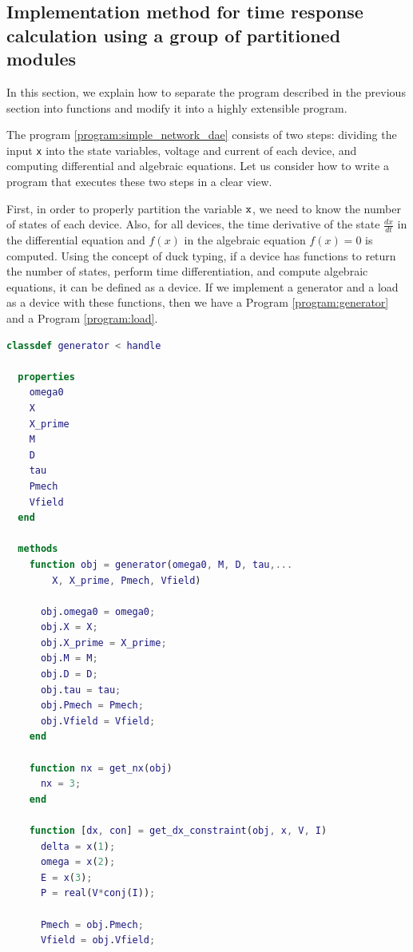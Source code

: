 \documentclass[graybox, envcountchap]{svmult}
\begin{document}
\subsection{Implementation method for time response calculation using a group of partitioned modules}
In this section, we explain how to separate the program described in the
previous section into functions and modify it into a highly extensible program.

\begin{example}\label{ex:gen_load}
  The program \nobreak\ref{program:simple_network_dae} consists of two steps:
  dividing the input \verb|x| into the state variables, voltage and current of
  each device, and computing differential and algebraic equations. Let us
  consider how to write a program that executes these two steps in a clear view.
 
  First, in order to properly partition the variable $\verb|x|$, we need to know
  the number of states of each device. Also, for all devices, the time
  derivative of the state $\tfrac{dx}{dt}$ in the differential equation and
  $f(x)$ in the algebraic equation $f(x)=0$ is computed. Using the concept of
  duck typing, if a device has functions to return the number of states, perform
  time differentiation, and compute algebraic equations, it can be defined as a
  device. If we implement a generator and a load as a device with these
  functions, then we have a Program \nobreak\ref{program:generator} and a
  Program \ref{program:load}.


\begin{lstlisting}[language=Matlab, caption=generator.m, label={program:generator}]
classdef generator < handle
    
  properties
    omega0
    X
    X_prime
    M
    D
    tau
    Pmech
    Vfield
  end

  methods
    function obj = generator(omega0, M, D, tau,...
        X, X_prime, Pmech, Vfield)

      obj.omega0 = omega0;
      obj.X = X;
      obj.X_prime = X_prime;
      obj.M = M;
      obj.D = D;
      obj.tau = tau;
      obj.Pmech = Pmech;
      obj.Vfield = Vfield;
    end

    function nx = get_nx(obj)
      nx = 3;
    end

    function [dx, con] = get_dx_constraint(obj, x, V, I)
      delta = x(1);
      omega = x(2);
      E = x(3);
      P = real(V*conj(I));

      Pmech = obj.Pmech;
      Vfield = obj.Vfield;


\end{lstlisting}
\end{example}
\end{document}
